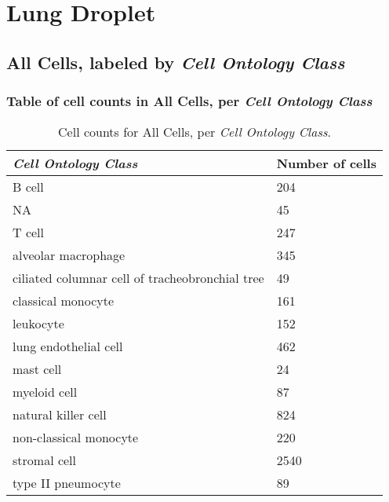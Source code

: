 \clearpage
\section{Lung Droplet}

\subsection{All Cells, labeled by \emph{Cell Ontology Class}}
\subsubsection{Table of cell counts in All Cells, per \emph{Cell Ontology Class}}\begin{table}[h]
\centering
\label{my-label}
\begin{tabular}{@{}ll@{}}
\toprule

\emph{Cell Ontology Class}& Number of cells \\ \midrule
B cell & 204 \\

NA & 45 \\

T cell & 247 \\

alveolar macrophage & 345 \\

ciliated columnar cell of tracheobronchial tree & 49 \\

classical monocyte & 161 \\

leukocyte & 152 \\

lung endothelial cell & 462 \\

mast cell & 24 \\

myeloid cell & 87 \\

natural killer cell & 824 \\

non-classical monocyte & 220 \\

stromal cell & 2540 \\

type II pneumocyte & 89 \\
\bottomrule
\end{tabular}
\caption{Cell counts for All Cells, per \emph{Cell Ontology Class}.}
\end{table}


